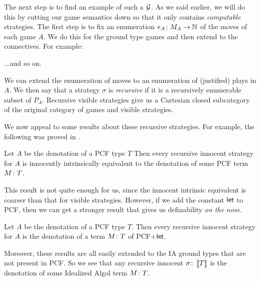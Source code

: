 The next step is to find an example of such a $\mathcal G$.
As we said earlier, we will do this by cutting our game semantics down so that it only contains \emph{computable} strategies.
The first step is to fix an enumeration $e_A\colon M_A \to \mathbb{N}$ of the moves of each game $A$.  
We do this for the ground type games and then extend to the connectives.  
For example:
...and so on.

We can extend the enumeration of moves to an enumeration of (justified) plays in $A$.  
We then say that a strategy $\sigma$ is \emph{recursive} if it is a recursively enumerable subset of $P_A$.
Recursive visible strategies give us a Cartesian closed subcategory of the original category of games and visible strategies.

We now appeal to some results about these recursive strategies.  
For example, the following was proved in \cite{hoPcf}.

\begin{theorem}
  Let $A$ be the denotation of a PCF type $T$
  Then every recursive innocent strategy for $A$ is innocently intrinsically equivalent to the denotation of some PCF term $M\colon T$.
\end{theorem}

This result is not quite enough for us, since the innocent intrinsic equivalent is coarser than that for visible strategies.  
However, if we add the constant $\operatorname{\mathsf{let}}$ to PCF, then we can get a stronger result that gives us definability \emph{on the nose}.

\begin{theorem}
  Let $A$ be the denotation of a PCF type $T$.
  Then every recursive innocent strategy for $A$ is the denotation of a term $M\colon T$ of PCF+$\operatorname{\mathsf{let}}$.
\end{theorem}

Moreover, these results are all easily extended to the IA ground types that are not present in PCF.  
So we see that any recursive innocent $\sigma\colon \left\llbracket T\right\rrbracket$ is the denotation of some Idealized Algol term $M \colon T$.

